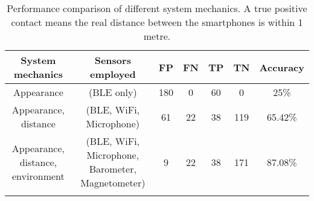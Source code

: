 \documentclass[graybox]{svmult}
\begin{document}


\begin{table}[h]
	\caption{Performance comparison of different system mechanics. A true positive contact means the real distance between the smartphones is within 1 metre.}
	\centering
	\begin{tabular}{c c c c c c c}
		\toprule
		\textbf{System mechanics} & \textbf{Sensors employed} & \textbf{FP} & \textbf{FN} & \textbf{TP} & \textbf{TN} & \textbf{Accuracy} \\
		\midrule
		Appearance & (BLE only) & 180 & 0 & 60 & 0 & 25\% \\ \addlinespace[0.2cm]
		Appearance, distance & (BLE, WiFi, Microphone) & 61 & 22 & 38 & 119 & 65.42\% \\ \addlinespace[0.2cm]
		Appearance, distance, environment & (BLE, WiFi, Microphone, Barometer, Magnetometer) & 9 & 22 & 38 & 171 & 87.08\% \\ \addlinespace[0.2cm]
		\bottomrule
	\end{tabular}
	\label{overallperformance}
\end{table}
\end{document}

